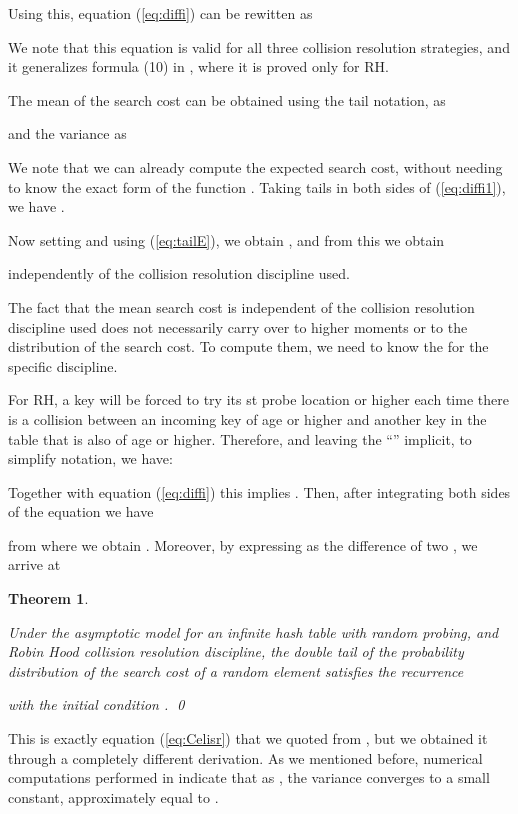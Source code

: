 \documentclass[proceedings]{aofa}
\newtheorem{theorem}{Theorem}
\begin{document}
Using this, equation (\ref{eq:diffi}) can be rewitten as



We note that this equation is valid for all three
collision resolution strategies, and it generalizes
formula (10) in \cite{Mit}, where it is proved only
for RH.

The mean of the search cost can be obtained using the tail notation, as

and the variance as



We note that we can already compute the expected search cost, without needing to know the exact form of the function .
Taking tails in both sides of (\ref{eq:diffi1}), we have
.

Now setting  and using (\ref{eq:tailE}), we obtain
,
and from this we obtain

independently of the collision resolution discipline used.


The fact that the mean search cost is independent of the collision resolution discipline used does not necessarily carry over to higher moments or to the distribution of the search cost. To compute them, we need to know the  for the specific discipline.


For RH, a key will be forced to try its st probe location or higher each time there is a collision between an incoming key of age  or higher and another key in the table that is also of age  or higher. Therefore, and leaving the ``'' implicit, to simplify notation, we have:



Together with equation (\ref{eq:diffi}) this implies
.
Then, after integrating both sides of the equation
we have

from where we obtain
.
Moreover, by expressing  as the difference
of two , we arrive at
\begin{theorem}\label{theorem:RH}

Under the asymptotic model for an infinite hash table with random probing, and Robin Hood collision resolution discipline, the double tail of the probability distribution of the search cost of a random element satisfies the recurrence

with the initial condition . \qed
\end{theorem}

This is exactly equation (\ref{eq:Celisr}) that we quoted from \cite{CelisT}, but we obtained it through a completely different derivation.
As we mentioned before, numerical computations performed in \cite{Celis} indicate that as
, the variance converges to a small constant, approximately equal to .
\end{document}
